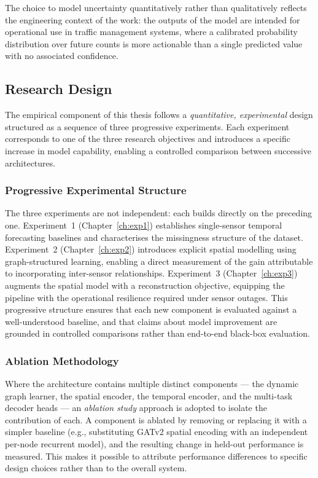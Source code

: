 The choice to model uncertainty quantitatively rather than qualitatively reflects the engineering context of the work: the outputs of the model are intended for operational use in traffic management systems, where a calibrated probability distribution over future counts is more actionable than a single predicted value with no associated confidence.

\subsection{Research Design}
\label{subsec:meth-design}

The empirical component of this thesis follows a \emph{quantitative, experimental} design structured as a sequence of three progressive experiments. Each experiment corresponds to one of the three research objectives and introduces a specific increase in model capability, enabling a controlled comparison between successive architectures.

\subsubsection{Progressive Experimental Structure}

The three experiments are not independent: each builds directly on the preceding one. Experiment~1 (Chapter~\ref{ch:exp1}) establishes single-sensor temporal forecasting baselines and characterises the missingness structure of the dataset. Experiment~2 (Chapter~\ref{ch:exp2}) introduces explicit spatial modelling using graph-structured learning, enabling a direct measurement of the gain attributable to incorporating inter-sensor relationships. Experiment~3 (Chapter~\ref{ch:exp3}) augments the spatial model with a reconstruction objective, equipping the pipeline with the operational resilience required under sensor outages. This progressive structure ensures that each new component is evaluated against a well-understood baseline, and that claims about model improvement are grounded in controlled comparisons rather than end-to-end black-box evaluation.

\subsubsection{Ablation Methodology}

Where the architecture contains multiple distinct components --- the dynamic graph learner, the spatial encoder, the temporal encoder, and the multi-task decoder heads --- an \emph{ablation study} approach is adopted to isolate the contribution of each. A component is ablated by removing or replacing it with a simpler baseline (e.g., substituting GATv2 spatial encoding with an independent per-node recurrent model), and the resulting change in held-out performance is measured. This makes it possible to attribute performance differences to specific design choices rather than to the overall system.

